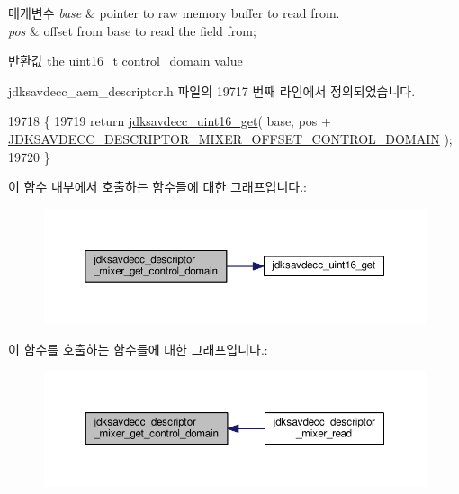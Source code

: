 \begin{DoxyParams}{매개변수}
{\em base} & pointer to raw memory buffer to read from. \\
\hline
{\em pos} & offset from base to read the field from; \\
\hline
\end{DoxyParams}
\begin{DoxyReturn}{반환값}
the uint16\+\_\+t control\+\_\+domain value 
\end{DoxyReturn}


jdksavdecc\+\_\+aem\+\_\+descriptor.\+h 파일의 19717 번째 라인에서 정의되었습니다.


\begin{DoxyCode}
19718 \{
19719     \textcolor{keywordflow}{return} \hyperlink{group__endian_ga3fbbbc20be954aa61e039872965b0dc9}{jdksavdecc\_uint16\_get}( base, pos + 
      \hyperlink{group__descriptor__mixer_gab0c4900f10973ad3bf6349cea6b6a62e}{JDKSAVDECC\_DESCRIPTOR\_MIXER\_OFFSET\_CONTROL\_DOMAIN} );
19720 \}
\end{DoxyCode}


이 함수 내부에서 호출하는 함수들에 대한 그래프입니다.\+:
\nopagebreak
\begin{figure}[H]
\begin{center}
\leavevmode
\includegraphics[width=350pt]{group__descriptor__mixer_ga4433959abad55c62b5393a1058eaf8b5_cgraph}
\end{center}
\end{figure}




이 함수를 호출하는 함수들에 대한 그래프입니다.\+:
\nopagebreak
\begin{figure}[H]
\begin{center}
\leavevmode
\includegraphics[width=350pt]{group__descriptor__mixer_ga4433959abad55c62b5393a1058eaf8b5_icgraph}
\end{center}
\end{figure}


